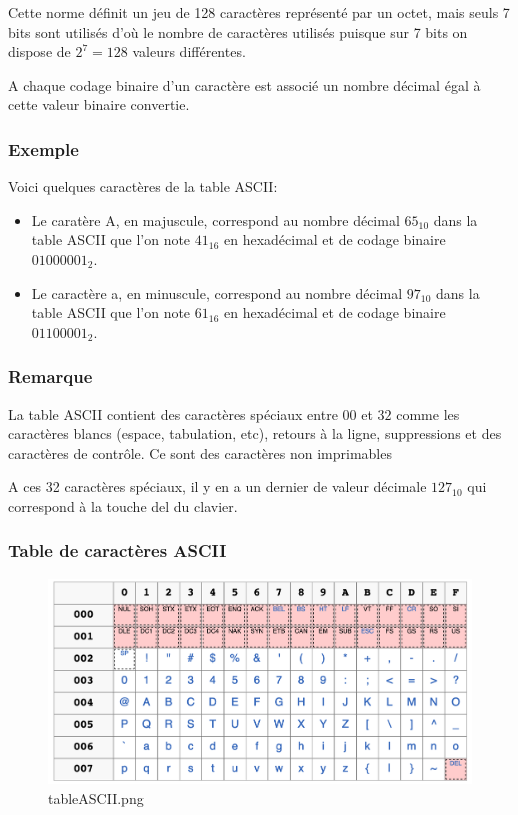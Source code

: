 \documentclass[11pt]{article}
\providecommand{\tightlist}{%
      \setlength{\itemsep}{0pt}\setlength{\parskip}{0pt}}
\begin{document}
Cette norme définit un jeu de 128 caractères représenté par un octet,
mais seuls 7 bits sont utilisés d'où le nombre de caractères utilisés
puisque sur 7 bits on dispose de \(2^{7}=128\) valeurs différentes.

A chaque codage binaire d'un caractère est associé un nombre décimal
égal à cette valeur binaire convertie.

\hypertarget{exemple}{%
\subsubsection*{Exemple}\label{exemple}}

Voici quelques caractères de la table ASCII:

\begin{itemize}
\tightlist
\item
  Le caratère A, en majuscule, correspond au nombre décimal \(65_{10}\)
  dans la table ASCII que l'on note \(41_{16}\) en hexadécimal et de
  codage binaire \(01000001_{2}\).
\item
  Le caractère a, en minuscule, correspond au nombre décimal \(97_{10}\)
  dans la table ASCII que l'on note \(61_{16}\) en hexadécimal et de
  codage binaire \(01100001_{2}\).
\end{itemize}

\hypertarget{remarque}{%
\subsubsection*{Remarque}\label{remarque}}

La table ASCII contient des caractères spéciaux entre \(00\) et \(32\)
comme les caractères blancs (espace, tabulation, etc), retours à la
ligne, suppressions et des caractères de contrôle. Ce sont des
caractères non imprimables

A ces 32 caractères spéciaux, il y en a un dernier de valeur décimale
\(127_{10}\) qui correspond à la touche del du clavier.

\hypertarget{table-de-caractuxe8res-ascii}{%
\subsubsection*{Table de caractères
ASCII}\label{table-de-caractuxe8res-ascii}}

\begin{figure}
\centering
\includegraphics{img/tableASCII.png}
\caption{tableASCII.png}
\end{figure}
\end{document}
